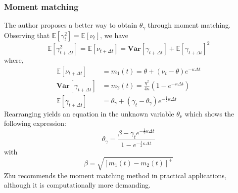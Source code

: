 \documentclass[12pt]{article}
\numberwithin{equation}{section}
\begin{document}
\subsubsection*{Moment matching}
The author proposes a better way to obtain $\theta_\gamma$ through moment matching. Observing that $\mathbb{E}[\gamma_t^2]=\mathbb{E}[\nu_t]$, we have
\begin{equation*}
\mathbb{E}[\gamma_{t+\Delta t}^2]=\mathbb{E}[\nu_{t+\Delta t}] =\textbf{Var}[\gamma_{t+\Delta t}] + \mathbb{E}[\gamma	_{t+\Delta t}]^2
\end{equation*}
where,
\begin{align*}
\mathbb{E}[\nu_{t+\Delta t}] &= m_1(t) = \theta + (\nu_t - \theta)e^{-\kappa \Delta t} \\
\textbf{Var}[\gamma_{t+\Delta t}] &=  m_2(t) = \frac{\eta^2}{4\kappa}(1-e^{-\kappa \Delta t}) \\
\mathbb{E}[\gamma_{t+\Delta t}] &= \theta_\gamma + (\gamma_t - \theta_\gamma)e^{-\frac{1}{2}\kappa\Delta t}
\end{align*}
Rearranging yields an equation in the unknown variable $\theta_\nu$ which shows the following expression:
\begin{equation*}
\theta_\gamma = \frac{\beta - \gamma_te^{-\frac{1}{2}\kappa\Delta t}}{1-e^{-\frac{1}{2}\kappa\Delta t}}
\end{equation*}
with
\begin{equation*}
\beta = \sqrt{[m_1(t)-m_2(t)]^+}
\end{equation*}
Zhu recommends the moment matching method in practical applications, although it is computationally more demanding.
\end{document}
